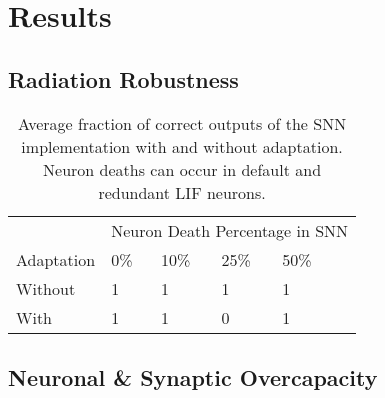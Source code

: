 \section{Results}\label{sec:results}

\subsection{Radiation Robustness}\label{subsec:algorithm_performance}

\begin{table}[H]
\caption{Average fraction of correct outputs of the SNN implementation with and without adaptation. Neuron deaths can occur in default and redundant LIF neurons.}
\begin{tabular}{llllll}
        & \multicolumn{5}{l}{Neuron Death Percentage in SNN} \\ \cmidrule{2-6}
        Adaptation & 0\%    & 10\%    & 25\%    & 50\%     \\ \hline
        Without      & 1      & 1       & 1       & 1            \\
        With      & 1      & 1       & 0       & 1            \\
        
\end{tabular}
\end{table}


\subsection{Neuronal \& Synaptic Overcapacity}\label{subsec:results_neuronal_synaptic_overcapacity}


